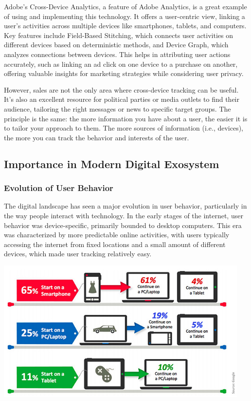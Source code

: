 Adobe's Cross-Device Analytics, a feature of Adobe Analytics, is a great example of using and implementing this technology. It offers a user-centric view, linking a user's activities across multiple devices like smartphones, tablets, and computers. Key features include Field-Based Stitching, which connects user activities on different devices based on deterministic methods, and Device Graph, which analyzes connections between devices. This helps in attributing user actions accurately, such as linking an ad click on one device to a purchase on another, offering valuable insights for marketing strategies while considering user privacy\cite{CrossDeviceAnalytics}.

However, sales are not the only area where cross-device tracking can be useful. It's also an excellent resource for political parties or media outlets to find their audience, tailoring the right messages or news to specific target groups. The principle is the same: the more information you have about a user, the easier it is to tailor your approach to them. The more sources of information (i.e., devices), the more you can track the behavior and interests of the user.
\subsection{Importance in Modern Digital Exosystem}

\subsubsection{Evolution of User Behavior}
The digital landscape has seen a major evolution in user behavior, particularly in the way people interact with technology. In the early stages of the internet, user behavior was device-specific, primarily bounded to desktop computers. This era was characterized by more predictable online activities, with users typically accessing the internet from fixed locations and a small amount of different devices, which made user tracking relatively easy.

\vspace{0.8cm}
\includegraphics[width=0.95\textwidth]{./assets/google-cdt-stats.jpeg}
\vspace{0.8cm}


